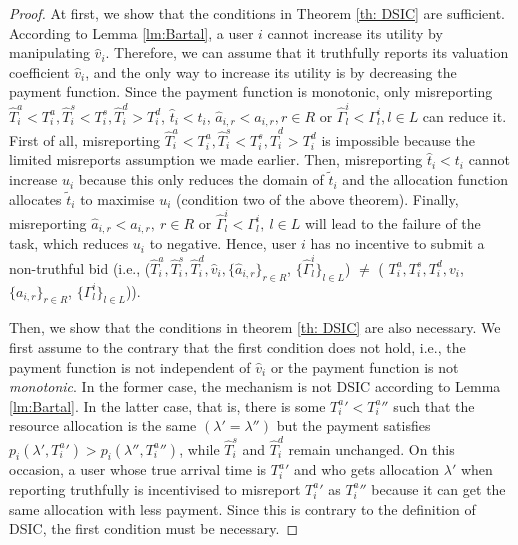 \documentclass[11pt]{phdthesis}
\begin{document}
\begin{proof}
  At first, we show that the conditions in Theorem \ref{th: DSIC} are sufficient. According to Lemma \ref{lm:Bartal}, a user $ i $ cannot increase its utility by manipulating $\hat{v}_i$. Therefore, we can assume that it truthfully reports its valuation coefficient $\hat{v}_i$, and the only way to increase its utility is by decreasing the payment function. Since the payment function is monotonic, only misreporting $\hat{T}_i^a < T_i^a, \hat{T}_i^s < T_i^s, \hat{T}_i^d > T_i^d$, $ \hat{t}_i < t_i $, $ \hat{a}_{i,r}  <  a_{i,r}, r \in R  $ or $   \hat{\Gamma}_l^i  <  \Gamma_l^i , l \in L  $ can reduce it. First of all, misreporting $\hat{T}_i^a < T_i^a, \hat{T}_i^s < T_i^s, \hat{T}_i^d > T_i^d$ is impossible because the limited misreports assumption we made earlier. Then, misreporting $ \hat{t}_i < t_i $ cannot increase $ u_i $ because this only reduces the domain of $\tilde{t}_i$ and the allocation function allocates $\tilde{t}_i$ to maximise $u_i$ (condition two of the above theorem). Finally, misreporting $ \hat{a}_{i,r}  <  a_{i,r} ,\ r \in R  $ or $   \hat{\Gamma}_l^i  <  \Gamma_l^i ,\  l \in L  $ will lead to the failure of the task, which reduces $ u_i $ to negative. Hence, user $ i $ has no incentive to submit a non-truthful bid (i.e.,  ($\hat{T}_i^a,\hat{T}_i^s,\hat{T}_i^d, \hat{v}_i, \{ \hat{a}_{i,r} \}_{r \in R} $, $ \{ \hat{\Gamma}_l^i \}_{l \in L} $) $ \neq $ ( $T_i^a, T_i^s, T_i^d, v_i $, $ \{ a_{i,r} \}_{r \in R} $, $ \{ \Gamma_l^i \}_{l \in L} $)).
    
    Then, we show that the conditions in theorem \ref{th: DSIC} are also necessary. We first assume to the contrary that the first condition does not hold, i.e., the payment function is not independent of $\hat{v}_i$ or the payment function is not \textit{monotonic}. In the former case, the mechanism is not DSIC according to Lemma \ref{lm:Bartal}. In the latter case, that is, there is some ${T_i^a}' < {T_i^a}''$ such that the resource allocation is the same $( \lambda' = \lambda'' )$ but the payment satisfies $p_i(\lambda', {T_i^a}') > p_i(\lambda'', {T_i^a}'')$, while $\hat{T}_i^s$ and $\hat{T}_i^d$ remain unchanged. On this occasion, a user whose true arrival time is ${T_i^a}'$ and who gets allocation $ \lambda' $ when reporting truthfully is incentivised to misreport ${T_i^a}'$ as ${T_i^a}''$ because it can get the same allocation with less payment. Since this is contrary to the definition of DSIC, the first condition must be necessary.
    

\end{proof}
\end{document}

